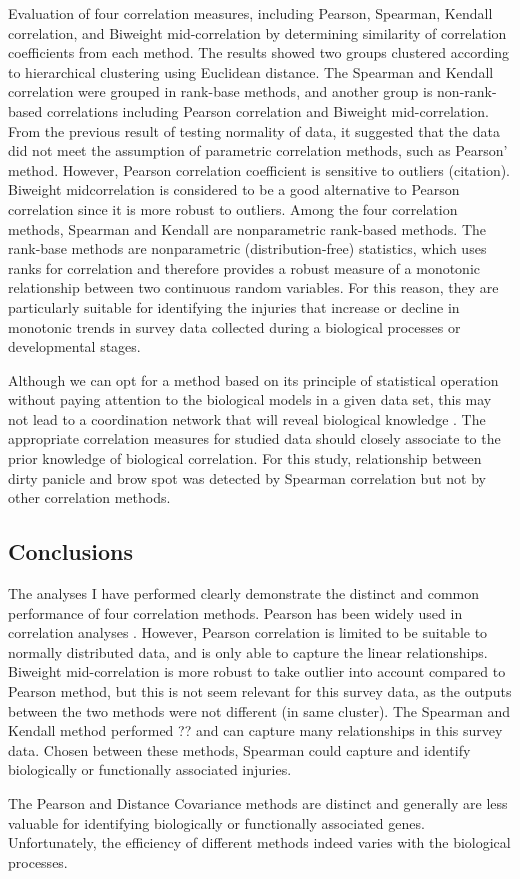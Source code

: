 Evaluation of four correlation measures, including Pearson, Spearman, Kendall correlation, and Biweight mid-correlation by determining similarity of correlation coefficients from each method. The results showed two groups clustered according to hierarchical clustering using Euclidean distance. The Spearman and Kendall correlation were grouped in rank-base methods, and another group is non-rank-based correlations including Pearson correlation and Biweight mid-correlation. From the previous result of testing normality of data, it suggested that the data did not meet the assumption of parametric correlation methods, such as Pearson' method. However, Pearson correlation coefficient is sensitive to outliers (citation). Biweight midcorrelation is considered to be a good alternative to Pearson correlation since it is more robust to outliers\citep{Wilcox_2012_Introduction}. Among the four correlation methods, Spearman and Kendall are nonparametric rank-based methods. The rank-base methods are nonparametric (distribution-free) statistics, which uses ranks for correlation and therefore provides a robust measure of a monotonic relationship between two continuous random variables. For this reason, they are particularly suitable for identifying the injuries that increase or decline in monotonic trends in survey data collected during a biological processes or developmental stages.

Although we can opt for a method based on its principle of statistical operation without paying attention to the biological models in a given data set, this may not lead to a coordination network that will reveal biological knowledge \citep{Kumari_2012_Evaluation}. The appropriate correlation measures for studied data should closely associate to the prior knowledge of biological correlation. For this study, relationship between dirty panicle and brow spot was detected by Spearman correlation but not by other correlation methods.

\subsection{Conclusions}

The analyses I have performed clearly demonstrate the distinct and common performance of four correlation methods. Pearson has been widely used in correlation analyses \citep{Zhang_2005_General}. However, Pearson correlation is limited to be suitable to normally distributed data, and is only able to capture the linear relationships. Biweight mid-correlation is more robust to  take outlier  into account compared to Pearson method, but this is not seem relevant for this survey data, as the outputs between the two methods were not different (in same cluster). The Spearman and Kendall method performed ?? and can capture many relationships in this survey data. Chosen between these methods, Spearman could capture and identify biologically or functionally associated injuries.

The Pearson and Distance Covariance methods are distinct and generally are less valuable for identifying biologically or functionally associated genes. Unfortunately, the efficiency of different methods indeed varies with the biological processes.